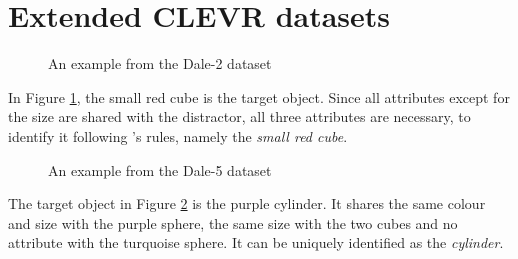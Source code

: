 \documentclass[11pt]{article}
\begin{document}
\appendix

\section{Extended CLEVR datasets}
\label{sec:extended-datasets}
\begin{figure}[h]
  \centering
  \caption{An example from the Dale-2 dataset}
  \label{fig:clevr-dale-2}
\end{figure}

In Figure \ref*{fig:clevr-dale-2}, the small red cube is the target object. Since all attributes except for the size are shared with the distractor, all three attributes are necessary, to identify it following \citet{Dale1995}'s rules, namely the \emph{small red cube}.


\begin{figure}[h]
  \centering
  \caption{An example from the Dale-5 dataset}
  \label{fig:clevr-dale-5}
\end{figure}
The target object in Figure \ref{fig:clevr-dale-5} is the purple cylinder. It shares the same colour and size with the purple sphere, the same size with the two cubes and no attribute with the turquoise sphere. It can be uniquely identified as the \emph{cylinder}.
\end{document}
